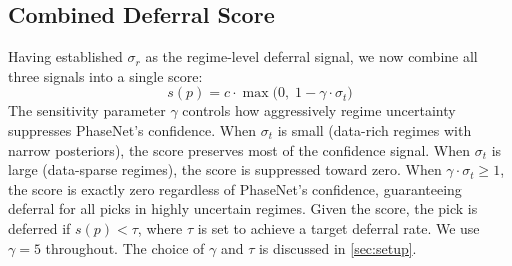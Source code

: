\subsection{Combined Deferral Score}
\label{sec:combined_score}

Having established $\sigma_r$ as the regime-level deferral signal, we now combine all three signals into a single score:
\begin{equation}
    s(p) = c \cdot \max\!\big(0,\; 1 - \gamma \cdot \sigma_t\big)
    \label{eq:deferral_score}
\end{equation}
The sensitivity parameter $\gamma$ controls how aggressively regime uncertainty suppresses PhaseNet's confidence. When $\sigma_t$ is small (data-rich regimes with narrow posteriors), the score preserves most of the confidence signal. When $\sigma_t$ is large (data-sparse regimes), the score is suppressed toward zero. When $\gamma \cdot \sigma_t \geq 1$, the score is exactly zero regardless of PhaseNet's confidence, guaranteeing deferral for all picks in highly uncertain regimes. Given the score, the pick is deferred if $s(p) < \tau$, where $\tau$ is set to achieve a target deferral rate. We use $\gamma = 5$ throughout. The choice of $\gamma$ and $\tau$ is discussed in \cref{sec:setup}.
